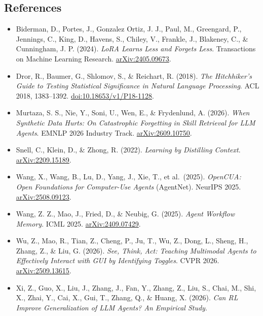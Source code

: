 \documentclass[
  10pt,
]{article}
\providecommand{\tightlist}{%
  \setlength{\itemsep}{0pt}\setlength{\parskip}{0pt}}
\begin{document}
\small

\subsection{References}\label{references}

\begin{itemize}
\tightlist
\item
  Biderman, D., Portes, J., Gonzalez Ortiz, J. J., Paul, M., Greengard,
  P., Jennings, C., King, D., Havens, S., Chiley, V., Frankle, J.,
  Blakeney, C., \& Cunningham, J. P. (2024). \emph{LoRA Learns Less and
  Forgets Less}. Transactions on Machine Learning Research.
  \href{https://arxiv.org/abs/2405.09673}{arXiv:2405.09673}.
\item
  Dror, R., Baumer, G., Shlomov, S., \& Reichart, R. (2018). \emph{The
  Hitchhiker's Guide to Testing Statistical Significance in Natural
  Language Processing}. ACL 2018, 1383--1392.
  \href{https://aclanthology.org/P18-1128/}{doi:10.18653/v1/P18-1128}.
\item
  Murtaza, S. S., Nie, Y., Soni, U., Wen, E., \& Frydenlund, A. (2026).
  \emph{When Synthetic Data Hurts: On Catastrophic Forgetting in Skill
  Retrieval for LLM Agents}. EMNLP 2026 Industry Track.
  \href{https://arxiv.org/abs/2609.10750}{arXiv:2609.10750}.
\item
  Snell, C., Klein, D., \& Zhong, R. (2022). \emph{Learning by
  Distilling Context}.
  \href{https://arxiv.org/abs/2209.15189}{arXiv:2209.15189}.
\item
  Wang, X., Wang, B., Lu, D., Yang, J., Xie, T., et al.~(2025).
  \emph{OpenCUA: Open Foundations for Computer-Use Agents} (AgentNet).
  NeurIPS 2025.
  \href{https://arxiv.org/abs/2508.09123}{arXiv:2508.09123}.
\item
  Wang, Z. Z., Mao, J., Fried, D., \& Neubig, G. (2025). \emph{Agent
  Workflow Memory}. ICML 2025.
  \href{https://arxiv.org/abs/2409.07429}{arXiv:2409.07429}.
\item
  Wu, Z., Mao, R., Tian, Z., Cheng, P., Ju, T., Wu, Z., Dong, L., Sheng,
  H., Zhang, Z., \& Liu, G. (2026). \emph{See, Think, Act: Teaching
  Multimodal Agents to Effectively Interact with GUI by Identifying
  Toggles}. CVPR 2026.
  \href{https://arxiv.org/abs/2509.13615}{arXiv:2509.13615}.
\item
  Xi, Z., Guo, X., Liu, J., Zhang, J., Fan, Y., Zhang, Z., Liu, S.,
  Chai, M., Shi, X., Zhai, Y., Cai, X., Gui, T., Zhang, Q., \& Huang, X.
  (2026). \emph{Can RL Improve Generalization of LLM Agents? An
  Empirical Study}.

\end{itemize}
\end{document}
